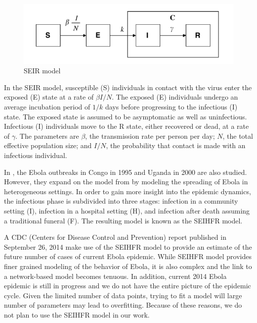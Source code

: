 \documentclass[10pt, journal,onecolumn]{IEEEtran}
\begin{document}
\begin{figure}[h!]
\captionsetup{justification=centering}
\includegraphics[scale=0.4]{seir_model_fig}
\centering\caption{SEIR model}
\label{fig:SEIR_model}
\end{figure}

In the SEIR model, susceptible (S) individuals in contact with the virus enter the exposed (E) state
at a rate of $\beta I / N$.
The exposed (E) individuals undergo an average incubation period of $1/k$ days before progressing to
the infectious (I) state. The exposed state is assumed to be asymptomatic as well as uninfectious.
Infectious (I) individuals move to the R state, either recovered or dead, at a rate of $\gamma$.
 The parameters are $\beta$, the transmission rate per person per day;
$N$, the total effective population size; and $I/N$, the probability that contact is made with
an infectious individual.

In \citep{legrand2007understanding}, the Ebola outbreaks in Congo in 1995 and Uganda in 2000 are
also studied. However, they expand on the model from \citep{chowell2004basic} by modeling the
spreading of Ebola in heterogeneous settings. In order to gain more insight into the epidemic
dynamics, the infectious phase is subdivided into three stages: infection in a community setting
(I), infection in a hospital setting (H), and infection after death assuming a traditional funeral
(F). The resulting model is known as the SEIHFR model.

A CDC (Centers for Disease Control and Prevention) report \citep{meltzer2014estimating} published in
September 26, 2014 make use of the SEIHFR model to provide an estimate of the future number of cases
of current Ebola epidemic. While SEIHFR model provides finer grained modeling of the behavior of
Ebola, it is also complex and the link to a network-based model becomes tenuous. In addition,
current 2014 Ebola epidemic is still in progress and we do not have the entire picture of the
epidemic cycle. Given the limited number of data points, trying to fit a model will large number of
parameters may lead to overfitting.  Because of these reasons, we do not plan to use the SEIHFR
model in our work.
\end{document}
